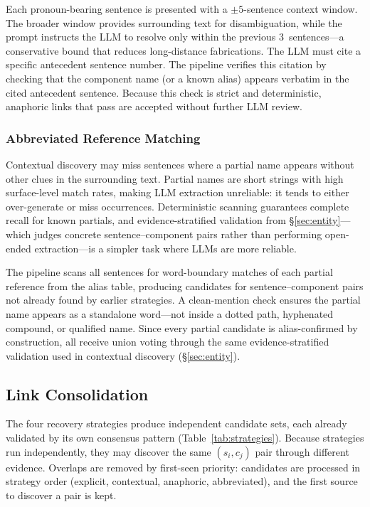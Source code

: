 Each pronoun-bearing sentence is presented with a $\pm5$-sentence
context window.
The broader window provides surrounding text for disambiguation,
while the prompt instructs the LLM to resolve only within the
previous 3~sentences---a conservative bound that reduces
long-distance fabrications.
The LLM must cite a specific antecedent sentence number.
The pipeline verifies this citation by checking that the
component name (or a known alias) appears verbatim in the
cited antecedent sentence.
Because this check is strict and deterministic, anaphoric
links that pass are accepted without further LLM review.

\subsubsection{Abbreviated Reference Matching}\label{sec:partial}

Contextual discovery may miss sentences where a partial name
appears without other clues in the surrounding text.
Partial names are short strings with high surface-level match rates,
making LLM extraction unreliable: it tends to either over-generate
or miss occurrences.
Deterministic scanning guarantees complete recall for known
partials, and evidence-stratified validation from
\S\ref{sec:entity}---which judges concrete sentence--component
pairs rather than performing open-ended extraction---is a simpler
task where LLMs are more reliable.

The pipeline scans all sentences for word-boundary matches of each
partial reference from the alias table, producing candidates for
sentence--component pairs not already found by earlier strategies.
A clean-mention check ensures the partial name appears as a
standalone word---not inside a dotted path, hyphenated compound, or
qualified name.
Since every partial candidate is alias-confirmed by construction,
all receive union voting through the same evidence-stratified
validation used in contextual discovery (\S\ref{sec:entity}).


\subsection{Link Consolidation}\label{sec:merge}

The four recovery strategies produce independent candidate
sets, each already validated by its own consensus pattern
(Table~\ref{tab:strategies}).
Because strategies run independently, they may discover the
same $(s_i, c_j)$ pair through different evidence.
Overlaps are removed by first-seen priority:
candidates are processed in strategy order
(explicit, contextual, anaphoric, abbreviated),
and the first source to discover a pair is kept.
